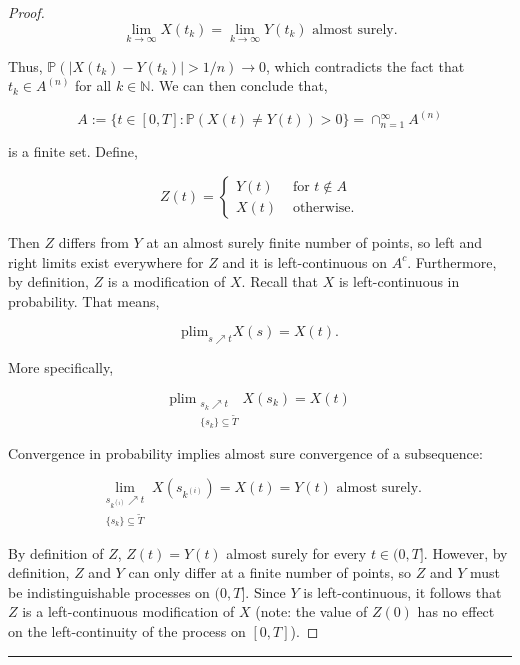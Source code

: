 \documentclass[12pt]{article}
\newcommand{\mb}{\mathbb}
\newcommand{\ra}{\rightarrow}
\newcommand{\te}{\text}
\newcommand{\lin}{\rule{\linewidth}{0.4 pt}}
\newcommand{\pr}{\mb{P}}							%
\newcommand{\T}{T}								%
\renewcommand{\t}{t}							%
\renewcommand{\tt}{s}							%
\newcommand{\X}{X}								%
\newcommand{\tp}[1]{(#1)}						%
\newcommand{\sln}[1]{^{(#1)}}					%
\newcommand{\alt}[1]{\widetilde{#1}}			%
\newcommand{\indx}[1]{_{#1}}					%
\newcommand{\XX}{Y}								%
\newcommand{\XXX}{Z}							%
\renewcommand{\it}{k}							%
\newcommand{\Tset}{\alt{T}}						%
\newcommand{\typset}{A}							%
\begin{document}
\begin{proof}
\[\lim_{\it \ra\infty} \X\tp{\t\indx{\it}} = \lim_{\it\ra\infty} \XX\tp{\t\indx{\it}} \te{ almost surely.}\]

Thus, \(\pr(|\X\tp{\t\indx{\it}} - \XX\tp{\t\indx{\it}}| > 1/n) \ra 0\), which contradicts the fact that \(\t\indx{\it} \in \typset\sln{n}\) for all \(\it\in\mb{N}\). We can then conclude that,

\[\typset:= \{\t\in [0,\T]: \pr(\X\tp{\t} \neq \XX\tp{\t}) > 0\} = \cap_{n = 1}^\infty \typset\sln{n}\]

is a finite set. Define,

\[\XXX\tp{\t}= \begin{cases}
\XX\tp{\t} &\te{ for } \t \notin \typset\\
\X\tp{\t} &\te{ otherwise.}
\end{cases}\]

Then \(\XXX\) differs from \(\XX\) at an almost surely finite number of points, so left and right limits exist everywhere for \(\XXX\) and it is left-continuous on \(\typset^c\). Furthermore, by definition, \(\XXX\) is a modification of \(\X\). Recall that \(\X\) is left-continuous in probability. That means,

\[\te{plim}_{\tt\nearrow \t} \X\tp{\tt} = \X\tp{\t}.\]

More specifically,

\[\te{plim}_{\substack{\tt\indx{\it}\nearrow \t\\\{\tt\indx{\it}\} \subseteq \Tset}} \X\tp{\tt\indx{\it}} = \X\tp{\t}\]

Convergence in probability implies almost sure convergence of a subsequence:

\[\lim_{\substack{\tt\indx{\it\sln{i}} \nearrow \t\\\{\tt\indx{\it}\}\subseteq \Tset}} \X\tp{\tt\indx{\it\sln{i}}} = \X\tp{\t} = \XX\tp{\t} \te{ almost surely.}\]

By definition of \(\XXX\), \(\XXX\tp{\t} = \XX\tp{\t}\) almost surely for every \(\t \in (0,\T]\). However, by definition, \(\XXX\) and \(\XX\) can only differ at a finite number of points, so \(\XXX\) and \(\XX\) must be indistinguishable processes on \((0,\T]\). Since \(\XX\) is left-continuous, it follows that \(\XXX\) is a left-continuous modification of \(\X\) (note: the value of \(\XXX\tp{0}\) has no effect on the left-continuity of the process on \([0,\T]\)).
\end{proof}

\lin
\end{document}
